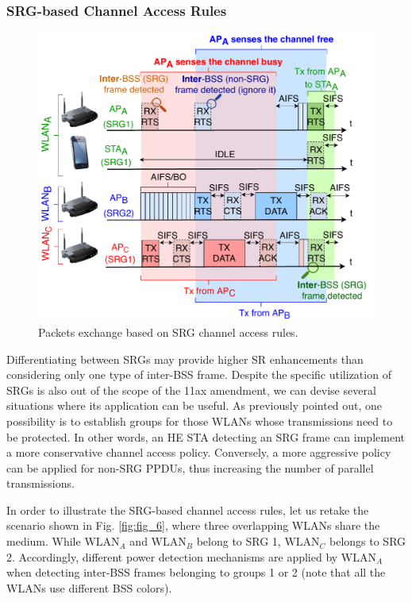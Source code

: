 \documentclass[comsoc]{IEEEtran}
\begin{document}
	\subsubsection{SRG-based Channel Access Rules}
	\label{section:srg_channel_access}
	\begin{figure}[ht!]
		\centering
		\includegraphics[width=\columnwidth]{fig_7}
		\caption{Packets exchange based on SRG channel access rules.}
		\label{fig:srg_channel_access}
	\end{figure}
	
	Differentiating between SRGs may provide higher SR enhancements than considering only one type of inter-BSS frame. Despite the specific utilization of SRGs is also out of the scope of the 11ax amendment, we can devise several situations where its application can be useful. As previously pointed out, one possibility is to establish groups for those WLANs whose transmissions need to be protected. In other words, an HE STA detecting an SRG frame can implement a more conservative channel access policy. Conversely, a more aggressive policy can be applied for non-SRG PPDUs, thus increasing the number of parallel transmissions. 
	
	In order to illustrate the SRG-based channel access rules, let us retake the scenario shown in Fig. \ref{fig:fig_6}, where three overlapping WLANs share the medium. While $\text{WLAN}_A$ and $\text{WLAN}_B$ belong to SRG 1, $\text{WLAN}_C$ belongs to SRG 2. Accordingly, different power detection mechanisms are applied by $\text{WLAN}_A$ when detecting inter-BSS frames belonging to groups 1 or 2 (note that all the WLANs use different BSS colors). 
	
\end{document}
